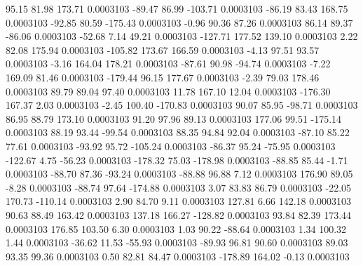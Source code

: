        95.15       81.98      173.71     0.0003103
      -89.47       86.99     -103.71     0.0003103
      -86.19       83.43      168.75     0.0003103
      -92.85       80.59     -175.43     0.0003103
       -0.96       90.36       87.26     0.0003103
       86.14       89.37      -86.06     0.0003103
      -52.68        7.14       49.21     0.0003103
     -127.71      177.52      139.10     0.0003103
        2.22       82.08      175.94     0.0003103
     -105.82      173.67      166.59     0.0003103
       -4.13       97.51       93.57     0.0003103
       -3.16      164.04      178.21     0.0003103
      -87.61       90.98      -94.74     0.0003103
       -7.22      169.09       81.46     0.0003103
     -179.44       96.15      177.67     0.0003103
       -2.39       79.03      178.46     0.0003103
       89.79       89.04       97.40     0.0003103
       11.78      167.10       12.04     0.0003103
     -176.30      167.37        2.03     0.0003103
       -2.45      100.40     -170.83     0.0003103
       90.07       85.95      -98.71     0.0003103
       86.95       88.79      173.10     0.0003103
       91.20       97.96       89.13     0.0003103
      177.06       99.51     -175.14     0.0003103
       88.19       93.44      -99.54     0.0003103
       88.35       94.84       92.04     0.0003103
      -87.10       85.22       77.61     0.0003103
      -93.92       95.72     -105.24     0.0003103
      -86.37       95.24      -75.95     0.0003103
     -122.67        4.75      -56.23     0.0003103
     -178.32       75.03     -178.98     0.0003103
      -88.85       85.44       -1.71     0.0003103
      -88.70       87.36      -93.24     0.0003103
      -88.88       96.88        7.12     0.0003103
      176.90       89.05       -8.28     0.0003103
      -88.74       97.64     -174.88     0.0003103
        3.07       83.83       86.79     0.0003103
      -22.05      170.73     -110.14     0.0003103
        2.90       84.70        9.11     0.0003103
      127.81        6.66      142.18     0.0003103
       90.63       88.49      163.42     0.0003103
      137.18      166.27     -128.82     0.0003103
       93.84       82.39      173.44     0.0003103
      176.85      103.50        6.30     0.0003103
        1.03       90.22      -88.64     0.0003103
        1.34      100.32        1.44     0.0003103
      -36.62       11.53      -55.93     0.0003103
      -89.93       96.81       90.60     0.0003103
       89.03       93.35       99.36     0.0003103
        0.50       82.81       84.47     0.0003103
     -178.89      164.02       -0.13     0.0003103
